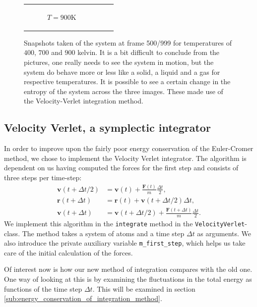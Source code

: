 \documentclass[a4paper]{article}
\renewcommand{\vec}[1]{\mathbf{#1}}
\begin{document}
\begin{figure}
\begin{tabular}[c]{ccc}
\begin{subfigure}[c]{0.32\textwidth}
                \caption{$T = 900$K}
            \end{subfigure}
        \end{tabular}
        \caption[Argon phases]{Snapshots taken of the system at frame 500/999
            for temperatures of $400$, $700$ and $900$ kelvin. It is a bit
            difficult to conclude from the pictures, one really needs to see
            the system in motion, but the system do behave more or less like a
            solid, a liquid and a gas for respective temperatures. It is
        possible to see a certain change in the entropy of the system across
    the three images. These made use of the Velocity-Verlet integration
method.}
        \label{fig:potential_iteration}
    \end{figure}

\subsection{Velocity Verlet, a symplectic integrator}
\label{sub:velocity_verlet_a_symplectic_integrator}
    
    In order to improve upon the fairly poor energy conservation of the
    Euler-Cromer method, we chose to implement the Velocity Verlet integrator.
    The algorithm is dependent on us having computed the forces for the first
    step and consists of three steps per time-step:
    \begin{align*}
        \vec{v}(t + \Delta t/2) &= \vec{v}(t) + \frac{\vec{F}(t)}{m}\frac{\Delta t}{2},\\
        \vec{r}(t + \Delta t) &= \vec{r}(t) + \vec{v}(t + \Delta t/2)\Delta t, \\
        \vec{v}(t + \Delta t) &= \vec{v}(t + \Delta t/2) + \frac{\vec{F}(t+\Delta t)}{m} \frac{\Delta t}{2}.
    \end{align*}
    We implement this algorithm in the \texttt{integrate} method in the
    \texttt{VelocityVerlet}-class. The method takes a system of atoms and a
    time step $\Delta t$ as arguments. We also introduce the private auxiliary
    variable \texttt{m\_first\_step}, which helps us take care of the initial
    calculation of the forces.
    
    Of interest now is how our new method of integration compares with the old
    one. One way of looking at this is by examining the fluctuations in the
    total energy as functions of the time step $\Delta t$. This will be
    examined in section \ref{sub:energy_conservation_of_integration_method}.
    
\end{document}

